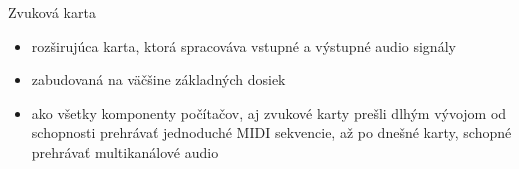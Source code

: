 \documentclass[pdf,fyma]{prosper}
\begin{document}
\begin{slide}{Zvuková karta}
\begin{itemize}
\item rozširujúca karta, ktorá spracováva vstupné a výstupné audio signály
\item zabudovaná na väčšine základných dosiek
\item ako všetky komponenty počítačov, aj zvukové karty prešli dlhým vývojom od schopnosti prehrávať jednoduché MIDI sekvencie, až po dnešné karty, schopné prehrávať multikanálové audio
\end{itemize}
\begin{figure}[ht]
  \begin{center}
  \label{sound}
  \end{center}
\end{figure}
\end{slide}
\end{document}
